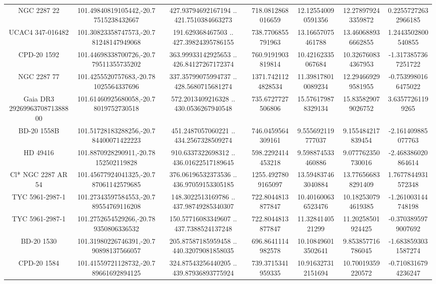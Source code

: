 \begin{table}
\begin{tabular}{ccccccc}
NGC  2287    22 & 101.49840819105442,-20.77515238432667 & 427.93794692167194 .. 421.7510384663273 & 718.0812868016659 & 12.125540090591356 & 12.278979243359872 & 0.22557272632966185 \\
UCAC4 347-016482 & 101.30823358747573,-20.781248147949068 & 191.629368467503 .. 427.39824395786155 & 738.7706855791963 & 13.16657075461788 & 13.460688936662855 & 1.2443502800540855 \\
CPD-20  1592 & 101.44698338700726,-20.779511355735202 & 363.99933142925653 .. 426.84127267172374 & 760.9191903819814 & 10.42162335067684 & 10.326760834367953 & -1.3173857367251722 \\
NGC  2287    77 & 101.4255520757683,-20.781025564337696 & 337.35799075994737 .. 428.5680715681274 & 1371.7421124828534 & 11.398178010089234 & 12.294669299581955 & -0.7539980166475022 \\
Gaia DR3 2926996370871388800 & 101.61460925680058,-20.78019752730518 & 572.2013409216328 .. 430.0536267940548 & 735.6727727506806 & 15.576179878329134 & 15.835829079026752 & 3.63577261199265 \\
BD-20  1558B & 101.51728183288256,-20.784400071422223 & 451.2487057060221 .. 434.2567328509274 & 746.0459564309161 & 9.555692119777037 & 9.155484217839454 & -2.161409885077763 \\
HD  49416 & 101.8870928290911,-20.78152502119828 & 910.6337322698312 .. 436.01622517189645 & 598.2292414453218 & 9.598874533460886 & 9.077762350730016 & -2.468386020864614 \\
Cl* NGC 2287     AR      54 & 101.45677924041325,-20.787061142579685 & 376.06196532373536 .. 436.97059153305185 & 1255.4927809165097 & 13.594837463040884 & 13.776566838291409 & 1.7677844931572348 \\
TYC 5961-2987-1 & 101.27343597584553,-20.789554769116208 & 148.3022513169786 .. 437.98749285340307 & 722.8044813877847 & 10.401600636523476 & 10.182530794619385 & -1.261003144748198 \\
TYC 5961-2987-1 & 101.2752654529266,-20.789350806336532 & 150.57716083349607 .. 437.7388524137248 & 722.8044813877847 & 11.3284140521299 & 11.20258501924425 & -0.3703895979007692 \\
BD-20  1530 & 101.31980226746391,-20.790898137566057 & 205.87587185959458 .. 440.32079081858035 & 696.8641114982578 & 10.108496013502641 & 9.853857716786045 & -1.6838593031587274 \\
CPD-20  1584 & 101.41559721128732,-20.789661692894125 & 324.87543256440205 .. 439.87936893775924 & 739.3715341959335 & 10.916327312151694 & 10.70019359220572 & -0.7108316794236247 \\

\end{tabular}
\end{table}
